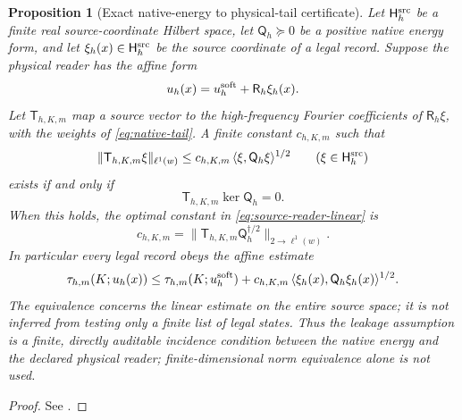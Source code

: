 \documentclass[11pt]{article}
\numberwithin{equation}{section}
\newtheorem{proposition}[proposition]{Proposition}
\theoremstyle{definition}
\theoremstyle{remark}
\newcommand{\norm}[1]{\lVert#1\rVert}
\newcommand{\ip}[2]{\langle#1,#2\rangle}
\begin{document}
\begin{proposition}[Exact native-energy to physical-tail certificate]
\label{prop:native-reader}
Let $\mathsf H_h^{\rm src}$ be a finite real source-coordinate Hilbert space, let $\mathsf Q_h\succeq0$ be a positive native energy form, and let $\xi_h(x)\in\mathsf H_h^{\rm src}$ be the source coordinate of a legal record.  Suppose the physical reader has the affine form
\begin{equation}
 u_h(x)=u_h^{\rm soft}+\mathsf R_h\xi_h(x).
 \label{eq:source-reader}
\end{equation}
Let $\mathsf T_{h,K,m}$ map a source vector to the high-frequency
Fourier coefficients of $\mathsf R_h\xi$, with the weights of
\eqref{eq:native-tail}.  A finite constant $c_{h,K,m}$ such that
\begin{equation}
 \norm{\mathsf T_{h,K,m}\xi}_{\ell^1(w)}
 \le c_{h,K,m}\,\ip{\xi}{\mathsf Q_h\xi}^{1/2}
 \qquad(\xi\in\mathsf H_h^{\rm src})
 \label{eq:source-reader-linear}
\end{equation}
exists if and only if
\begin{equation}
 \mathsf T_{h,K,m}\ker\mathsf Q_h=0.
 \label{eq:source-reader-kernel}
\end{equation}
When this holds, the optimal constant in
\eqref{eq:source-reader-linear} is
\begin{equation}
 c_{h,K,m}
 =\norm{\mathsf T_{h,K,m}\mathsf Q_h^{\dagger/2}}_{2\to\ell^1(w)}.
 \label{eq:source-reader-constant}
\end{equation}
In particular every legal record obeys the affine estimate
\begin{equation}
 \tau_{h,m}(K;u_h(x))
 \le \tau_{h,m}(K;u_h^{\rm soft})
      +c_{h,K,m}\,\ip{\xi_h(x)}{\mathsf Q_h\xi_h(x)}^{1/2}.
 \label{eq:source-reader-tail}
\end{equation}
The equivalence concerns the linear estimate on the entire source space;
it is not inferred from testing only a finite list of legal states.
Thus the leakage assumption is a finite, directly auditable incidence condition between the native energy and the declared physical reader; finite-dimensional norm equivalence alone is not used.
\end{proposition}
\begin{proof}
See .
\end{proof}
\end{document}
